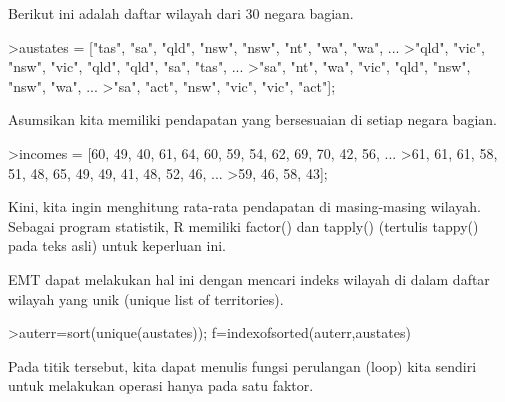 \documentclass{article}
\newenvironment{eulernotebook}{\par}{\par}
\newenvironment{eulercomment}{\par\medskip}{\par\medskip}
\begin{document}
\begin{eulernotebook}
\begin{eulercomment}
\begin{eulercomment}
\begin{eulercomment}
\begin{eulercomment}
\begin{eulercomment}
Berikut ini adalah daftar wilayah dari 30 negara bagian.
\end{eulercomment}
\begin{eulerprompt}
>austates = ["tas", "sa", "qld", "nsw", "nsw", "nt", "wa", "wa", ...
>"qld", "vic", "nsw", "vic", "qld", "qld", "sa", "tas", ...
>"sa", "nt", "wa", "vic", "qld", "nsw", "nsw", "wa", ...
>"sa", "act", "nsw", "vic", "vic", "act"];
\end{eulerprompt}
\begin{eulercomment}
Asumsikan kita memiliki pendapatan yang bersesuaian di setiap negara
bagian.
\end{eulercomment}
\begin{eulerprompt}
>incomes = [60, 49, 40, 61, 64, 60, 59, 54, 62, 69, 70, 42, 56, ...
>61, 61, 61, 58, 51, 48, 65, 49, 49, 41, 48, 52, 46, ...
>59, 46, 58, 43];
\end{eulerprompt}
\begin{eulercomment}
Kini, kita ingin menghitung rata-rata pendapatan di masing-masing
wilayah. Sebagai program statistik, R memiliki factor() dan tapply()
(tertulis tappy() pada teks asli) untuk keperluan ini.

EMT dapat melakukan hal ini dengan mencari indeks wilayah di dalam
daftar wilayah yang unik (unique list of territories).
\end{eulercomment}
\begin{eulerprompt}
>auterr=sort(unique(austates)); f=indexofsorted(auterr,austates)
\end{eulerprompt}
\begin{euleroutput}
  [6,  5,  4,  2,  2,  3,  8,  8,  4,  7,  2,  7,  4,  4,  5,  6,  5,  3,
  8,  7,  4,  2,  2,  8,  5,  1,  2,  7,  7,  1]
\end{euleroutput}
\begin{eulercomment}
Pada titik tersebut, kita dapat menulis fungsi perulangan (loop) kita
sendiri untuk melakukan operasi hanya pada satu faktor.


\end{eulercomment}
\end{eulercomment}
\end{eulercomment}
\end{eulercomment}
\end{eulercomment}
\end{eulernotebook}
\end{document}
